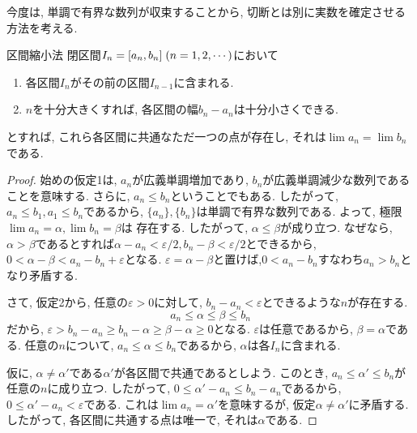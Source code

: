\documentclass[a4j,dvipdfmx]{jsarticle}
\numberwithin{equation}{section}
\begin{document}
            今度は, 単調で有界な数列が収束することから, 切断とは別に実数を確定させる方法を考える.
            \begin{itembox}{区間縮小法}
                閉区間$I_n=[a_n,b_n]\hspace{1mm}(n=1,2,\cdots)$において
                \begin{enumerate}
                    \item 各区間$I_n$がその前の区間$I_{n-1}$に含まれる.
                    \item $n$を十分大きくすれば, 各区間の幅$b_n-a_n$は十分小さくできる.
                \end{enumerate}
                とすれば, これら各区間に共通なただ一つの点が存在し, それは$\lim a_n=\lim b_n$である.
            \end{itembox}
            \begin{proof}
                始めの仮定1は, $a_n$が広義単調増加であり, $b_n$が広義単調減少な数列であることを意味する. さらに, $a_n\leq b_n$ということでもある.
                したがって, $a_n\leq b_1,a_1\leq b_n$であるから, $\{a_n\},\{b_n\}$は単調で有界な数列である. よって, 極限$\lim a_n =\alpha , \lim b_n=\beta$は
                存在する. したがって, $\alpha\leq \beta$が成り立つ. なぜなら, $\alpha>\beta$であるとすれば$\alpha -a_n<\varepsilon/2,b_n-\beta<\varepsilon/2$とできるから, 
                $0<\alpha-\beta<a_n-b_n+\varepsilon$となる. $\varepsilon=\alpha-\beta$と置けば,$0<a_n-b_n$すなわち$a_n>b_n$となり矛盾する.
                
                さて, 仮定2から, 任意の$\varepsilon>0$に対して, $b_n-a_n<\varepsilon$とできるような$n$が存在する. 
                \begin{equation*}
                    a_n\leq \alpha\leq \beta\leq b_n
                \end{equation*}
                だから, $\varepsilon>b_n-a_n\geq b_n-\alpha\geq \beta - \alpha\geq0$となる. $\varepsilon$は任意であるから, $\beta=\alpha$である.
                任意の$n$について, $a_n\leq \alpha \leq b_n$であるから, $\alpha$は各$I_n$に含まれる. 
                
                仮に, $\alpha\neq \alpha'$である$\alpha'$が各区間で共通であるとしよう. このとき, $a_n\leq \alpha'\leq b_n$が任意の$n$に成り立つ.
                したがって, $0\leq \alpha'-a_n \leq b_n - a_n$であるから, $0\leq \alpha'-a_n<\varepsilon$である. これは$\lim a_n=\alpha'$を意味するが, 
                仮定$\alpha\neq\alpha'$に矛盾する. したがって, 各区間に共通する点は唯一で, それは$\alpha$である.
            \end{proof}
\end{document}
